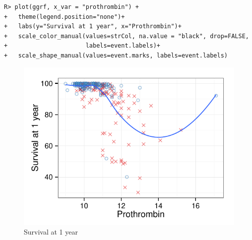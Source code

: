 \documentclass[nojss]{jss}\usepackage[]{graphicx}\usepackage[]{color}
\makeatletter
\def\maxwidth{ %
  \ifdim\Gin@nat@width>\linewidth
    \linewidth
  \else
    \Gin@nat@width
  \fi
}
\newenvironment{kframe}{%
 \def\at@end@of@kframe{}%
 \ifinner\ifhmode%
  \def\at@end@of@kframe{\end{minipage}}%
  \begin{minipage}{\columnwidth}%
 \fi\fi%
 \def\FrameCommand##1{\hskip\@totalleftmargin \hskip-\fboxsep
 \colorbox{shadecolor}{##1}\hskip-\fboxsep
     \hskip-\linewidth \hskip-\@totalleftmargin \hskip\columnwidth}%
 \MakeFramed {\advance\hsize-\width
   \@totalleftmargin\z@ \linewidth\hsize
   \@setminipage}}%
 {\par\unskip\endMakeFramed%
 \at@end@of@kframe}
\newenvironment{knitrout}{}{} %
\makeatother
\begin{document}
\begin{knitrout}\footnotesize
{}\color{fgcolor}\begin{kframe}
\begin{verbatim}
R> plot(ggrf, x_var = "prothrombin") +
+   theme(legend.position="none")+
+   labs(y="Survival at 1 year", x="Prothrombin")+
+   scale_color_manual(values=strCol, na.value = "black", drop=FALSE,
+                      labels=event.labels)+
+   scale_shape_manual(values=event.marks, labels=event.labels)
\end{verbatim}
\end{kframe}\begin{figure}[!htpb]

{\centering \includegraphics[width=\maxwidth]{figure/rfs-variable-plotProthrombin-1} 

}

\caption[Survival at 1 year]{Survival at 1 year\label{fig:variable-plotProthrombin}}
\end{figure}


\end{knitrout}
\end{document}
